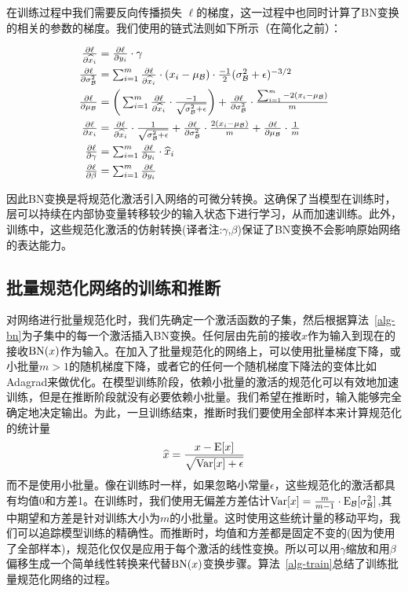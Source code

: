 \documentclass[twocolumn]{article}
\begin{document}
在训练过程中我们需要反向传播损失 $\ell$的梯度，这一过程中也同时计算了BN变换的相关的参数的梯度。我们使用的链式法则如下所示（在简化之前）： 

\begin{align*}
\textstyle\frac{\partial \ell}{\partial \widehat{x}_i} &\textstyle= \frac{\partial \ell}{\partial y_i}\cdot \gamma \\ 
\textstyle\frac{\partial \ell}{\partial \sigma_{\mathcal{B}}^2}
&\textstyle= \sum_{i=1}^m \frac{\partial \ell}{\partial \widehat{x}_i}\cdot(x_i-\mu_{\mathcal{B}})\cdot
\frac{-1}{2}(\sigma_{\mathcal{B}}^2+\epsilon)^{-3/2} \\ 
\textstyle\frac{\partial \ell}{\partial \mu_{\mathcal{B}}} &\textstyle=
\bigg(\sum_{i=1}^m \frac{\partial \ell}{\partial \widehat{x}_i}\cdot
\frac{-1}{\sqrt{\sigma_{\mathcal{B}}^2+\epsilon}}\bigg) +
\frac{\partial \ell}{\partial \sigma_{\mathcal{B}}^2}\cdot\frac{   \sum_{i=1}^m
  -2(x_i-\mu_{\mathcal{B}})}{m}\\
 \textstyle  \frac{\partial \ell}{\partial x_i} &\textstyle= \frac{\partial \ell}{\partial \widehat{x}_i} \cdot
\frac{1}{\sqrt{\sigma_{\mathcal{B}}^2+\epsilon}} + \frac{\partial \ell}{\partial \sigma_{\mathcal{B}}^2}\cdot
\frac{2(x_i-\mu_{\mathcal{B}})}{m} + \frac{\partial \ell}{\partial \mu_{\mathcal{B}}}\cdot \frac{1}{m}\\
\textstyle\frac{\partial \ell}{\partial \gamma}&\textstyle= \sum_{i=1}^m \frac{\partial \ell}{\partial y_i} \cdot \widehat{x}_i
  \\ 
\textstyle  \frac{\partial \ell}{\partial \beta} &\textstyle= \sum_{i=1}^m \frac{\partial \ell}{\partial y_i}
\end{align*}

因此BN变换是将规范化激活引入网络的可微分转换。这确保了当模型在训练时，层可以持续在内部协变量转移较少的输入状态下进行学习，从而加速训练。此外，训练中，这些规范化激活的仿射转换(译者注:$\gamma$,$\beta$)保证了BN变换不会影响原始网络的表达能力。

\subsection{批量规范化网络的训练和推断}
\label{sec-training}

对网络进行批量规范化时，我们先确定一个激活函数的子集，然后根据算法~\ref{alg-bn}为子集中的每一个激活插入BN变换。任何层由先前的接收$x$作为输入到现在的接收$\text{BN}(x)$作为输入。在加入了批量规范化的网络上，可以使用批量梯度下降，或小批量$m>1$的随机梯度下降，或者它的任何一个随机梯度下降法的变体比如Adagrad\cite{adagrad}来做优化。在模型训练阶段，依赖小批量的激活的规范化可以有效地加速训练，但是在推断阶段就没有必要依赖小批量。我们希望在推断时，输入能够完全确定地决定输出。为此，一旦训练结束，推断时我们要使用全部样本来计算规范化的统计量$$\widehat{x}=\frac{x-\text{E}[x]}{\sqrt{\text{Var}[x]+\epsilon}}$$而不是使用小批量。像在训练时一样，如果忽略小常量$\epsilon$，这些规范化的激活都具有均值0和方差1。在训练时，我们使用无偏差方差估计$\text{Var}[x] = \frac{m}{m-1}\cdot\text{E}_{\mathcal{B}}[\sigma_{\mathcal{B}}^2]$,其中期望和方差是针对训练大小为$m$的小批量。这时使用这些统计量的移动平均，我们可以追踪模型训练的精确性。而推断时，均值和方差都是固定不变的(因为使用了全部样本)，规范化仅仅是应用于每个激活的线性变换。所以可以用$\gamma$缩放和用$\beta$偏移生成一个简单线性转换来代替$\text{BN}(x)$变换步骤。算法~\ref{alg-train}总结了训练批量规范化网络的过程。
\end{document}
